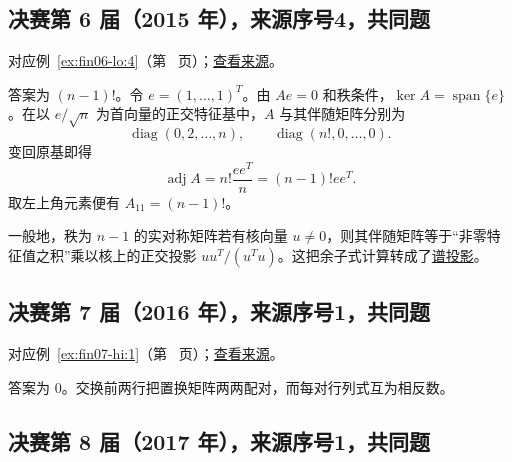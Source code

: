 \documentclass[UTF8,12pt,a4paper,fontset=fandol]{ctexart}
\begin{document}
\subsection{决赛第 6 届（2015 年），来源序号4，共同题}\label{ans:fin06-lo:4}\label{pr:fin06-lo:4}

对应例~\ref{ex:fin06-lo:4}（第~\pageref{ex:fin06-lo:4} 页）；\href{https://github.com/lzxcr/cmc-mathematics/blob/64916fa1fdbc3e444a652eca204d5669058ee321/src/problems/finals/06/04.md}{查看来源}。

\begin{solve}

答案为 $(n-1)!$。令 $e=(1,\ldots,1)^T$。由 $Ae=0$ 和秩条件，$\ker A=\operatorname{span}\{e\}$。在以 $e/\sqrt n$ 为首向量的正交特征基中，$A$ 与其伴随矩阵分别为
\[
\operatorname{diag}(0,2,\ldots,n),\qquad
\operatorname{diag}(n!,0,\ldots,0).
\]
变回原基即得
\[
\operatorname{adj}A=n!\frac{ee^T}{n}=(n-1)!ee^T.
\]
取左上角元素便有 $A_{11}=(n-1)!$。

\end{solve}

\begin{remark}[方法与条件]

一般地，秩为 $n-1$ 的实对称矩阵若有核向量 $u\ne0$，则其伴随矩阵等于“非零特征值之积”乘以核上的正交投影 $uu^T/(u^Tu)$。这把余子式计算转成了\hyperref[app:linear-spectral]{谱投影}。

\end{remark}

\subsection{决赛第 7 届（2016 年），来源序号1，共同题}\label{ans:fin07-hi:1}\label{pr:fin07-hi:1}

对应例~\ref{ex:fin07-hi:1}（第~\pageref{ex:fin07-hi:1} 页）；\href{https://github.com/lzxcr/cmc-mathematics/blob/64916fa1fdbc3e444a652eca204d5669058ee321/src/problems/finals/07/01.md}{查看来源}。

\begin{solve}

答案为 $0$。交换前两行把置换矩阵两两配对，而每对行列式互为相反数。

\end{solve}

\subsection{决赛第 8 届（2017 年），来源序号1，共同题}\label{ans:fin08-hi:1}\label{pr:fin08-hi:1}
\end{document}

